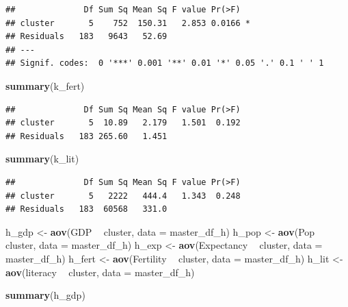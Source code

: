 \documentclass[]{article}
\newenvironment{Shaded}{\begin{snugshade}}{\end{snugshade}}
\newcommand{\DataTypeTok}[1]{\textcolor[rgb]{0.13,0.29,0.53}{#1}}
\newcommand{\KeywordTok}[1]{\textcolor[rgb]{0.13,0.29,0.53}{\textbf{#1}}}
\newcommand{\NormalTok}[1]{#1}
\newcommand{\OperatorTok}[1]{\textcolor[rgb]{0.81,0.36,0.00}{\textbf{#1}}}
\newcommand{\StringTok}[1]{\textcolor[rgb]{0.31,0.60,0.02}{#1}}
\begin{document}
\begin{verbatim}
##              Df Sum Sq Mean Sq F value Pr(>F)  
## cluster       5    752  150.31   2.853 0.0166 *
## Residuals   183   9643   52.69                 
## ---
## Signif. codes:  0 '***' 0.001 '**' 0.01 '*' 0.05 '.' 0.1 ' ' 1
\end{verbatim}

\begin{Shaded}
\begin{Highlighting}[]
\KeywordTok{summary}\NormalTok{(k_fert)}
\end{Highlighting}
\end{Shaded}

\begin{verbatim}
##              Df Sum Sq Mean Sq F value Pr(>F)
## cluster       5  10.89   2.179   1.501  0.192
## Residuals   183 265.60   1.451
\end{verbatim}

\begin{Shaded}
\begin{Highlighting}[]
\KeywordTok{summary}\NormalTok{(k_lit)}
\end{Highlighting}
\end{Shaded}

\begin{verbatim}
##              Df Sum Sq Mean Sq F value Pr(>F)
## cluster       5   2222   444.4   1.343  0.248
## Residuals   183  60568   331.0
\end{verbatim}

\begin{Shaded}
\begin{Highlighting}[]
\NormalTok{h_gdp <-}\StringTok{ }\KeywordTok{aov}\NormalTok{(GDP }\OperatorTok{~}\StringTok{ }\NormalTok{cluster, }\DataTypeTok{data =}\NormalTok{ master_df_h)}
\NormalTok{h_pop <-}\StringTok{ }\KeywordTok{aov}\NormalTok{(Pop }\OperatorTok{~}\StringTok{ }\NormalTok{cluster, }\DataTypeTok{data =}\NormalTok{ master_df_h) }
\NormalTok{h_exp <-}\StringTok{ }\KeywordTok{aov}\NormalTok{(Expectancy }\OperatorTok{~}\StringTok{ }\NormalTok{cluster, }\DataTypeTok{data =}\NormalTok{ master_df_h) }
\NormalTok{h_fert <-}\StringTok{ }\KeywordTok{aov}\NormalTok{(Fertility }\OperatorTok{~}\StringTok{ }\NormalTok{cluster, }\DataTypeTok{data =}\NormalTok{ master_df_h) }
\NormalTok{h_lit <-}\StringTok{ }\KeywordTok{aov}\NormalTok{(literacy }\OperatorTok{~}\StringTok{ }\NormalTok{cluster, }\DataTypeTok{data =}\NormalTok{ master_df_h) }

\KeywordTok{summary}\NormalTok{(h_gdp)}
\end{Highlighting}
\end{Shaded}
\end{document}
